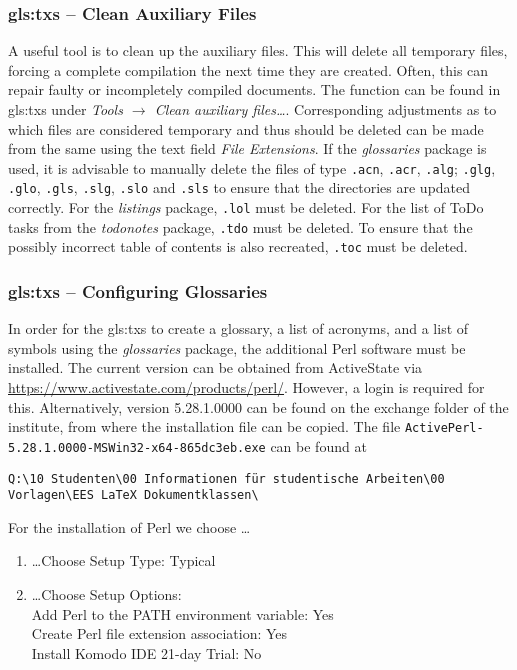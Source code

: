 \subsubsection{\gls*{gls:txs} -- Clean Auxiliary Files}
\label{sec:txs:auxFiles}
A useful tool is to clean up the auxiliary files. This will delete all temporary files, forcing a complete compilation the next time they are created. Often, this can repair faulty or incompletely compiled documents. The function can be found in \gls{gls:txs} under \textit{Tools $\rightarrow$ Clean auxiliary files\ldots}. Corresponding adjustments as to which files are considered temporary and thus should be deleted can be made from the same using the text field \textit{File Extensions}. If the \textit{glossaries} package is used, it is advisable to manually delete the files of type \texttt{.acn}, \texttt{.acr}, \texttt{.alg}; \texttt{.glg}, \texttt{.glo}, \texttt{.gls}, \texttt{.slg}, \texttt{.slo} and \texttt{.sls} to ensure that the directories are updated correctly. For the \textit{listings} package, \texttt{.lol} must be deleted. For the list of ToDo tasks from the \textit{todonotes} package, \texttt{.tdo} must be deleted. To ensure that the possibly incorrect table of contents is also recreated, \texttt{.toc} must be deleted.




\subsubsection{\gls*{gls:txs} -- Configuring Glossaries}
\label{sec:txs:glossary}
In order for the \gls{gls:txs} to create a glossary, a list of acronyms, and a list of symbols using the \textit{glossaries} package, the additional Perl software must be installed. The current version can be obtained from ActiveState via \url{https://www.activestate.com/products/perl/}. However, a login is required for this. Alternatively, version 5.28.1.0000 can be found on the exchange folder of the institute, from where the installation file can be copied. The file \verb|ActivePerl-5.28.1.0000-MSWin32-x64-865dc3eb.exe| can be found at

\begin{lstlisting}[caption=Source path of Perl on the institute server]
	Q:\10 Studenten\00 Informationen für studentische Arbeiten\00 Vorlagen\EES LaTeX Dokumentklassen\
\end{lstlisting}

For the installation of Perl we choose \ldots 
\begin{enumerate}
	\item \ldots Choose Setup Type: Typical
	\item \ldots Choose Setup Options: \\
	Add Perl to the PATH environment variable: Yes\\
	Create Perl file extension association: Yes\\
	Install Komodo IDE 21-day Trial: No
\end{enumerate}

